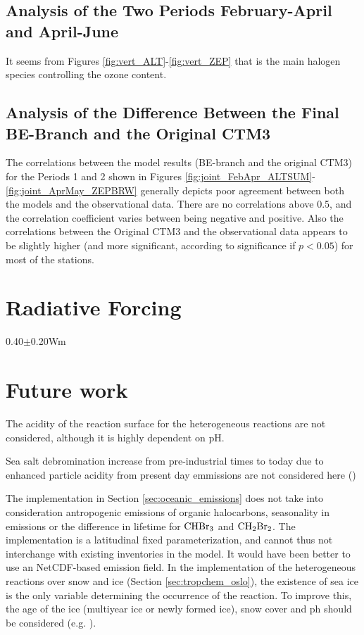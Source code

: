 \subsection{Analysis of the Two Periods February-April and April-June}\label{sec:disc_twoPeriods}

It seems from Figures \ref{fig:vert_ALT}-\ref{fig:vert_ZEP} that  is the main halogen species controlling the ozone content. 


\subsection{Analysis of the Difference Between the Final BE-Branch and the Original CTM3}\label{sec:disc_origBE}

The correlations between the model results (BE-branch and the original CTM3) for the Periods 1 and 2 shown in Figures \ref{fig:joint_FebApr_ALTSUM}-\ref{fig:joint_AprMay_ZEPBRW} generally depicts poor agreement between both the models and the observational data. There are no correlations above 0.5, and the correlation coefficient varies between being negative and positive. Also the correlations between the Original CTM3 and the observational data appears to be slightly higher (and more significant, according to significance if $p<0.05$) for most of the stations. 


\section{Radiative Forcing}\label{sec:disc_RF}

0.40$\pm$0.20Wm \cite{IPCCchapter8}

\section{Future work}

The acidity of the reaction surface for the heterogeneous reactions are not considered, although it is highly dependent on pH. 

\medskip
Sea salt debromination increase from pre-industrial times to today due to enhanced particle acidity from present day emmissions are not considered here (\cite{Parella})

\medskip
The implementation in Section \ref{sec:oceanic_emissions} does not take into consideration antropogenic emissions of organic halocarbons, seasonality in emissions or the difference in lifetime for $\mathrm{CHBr_3}$ and $\mathrm{CH_2Br_2}$. The implementation is a latitudinal fixed parameterization, and cannot thus not interchange with existing inventories in the model. It would have been better to use an NetCDF-based emission field. 
\medskip
In the implementation of the heterogeneous reactions over snow and ice (Section \ref{sec:tropchem_oslo}), the existence of sea ice is the only variable determining the occurrence of the reaction. To improve this, the age of the ice (multiyear ice or newly formed ice), snow cover and ph should be considered (e.g. \cite{Peterson2019}).

